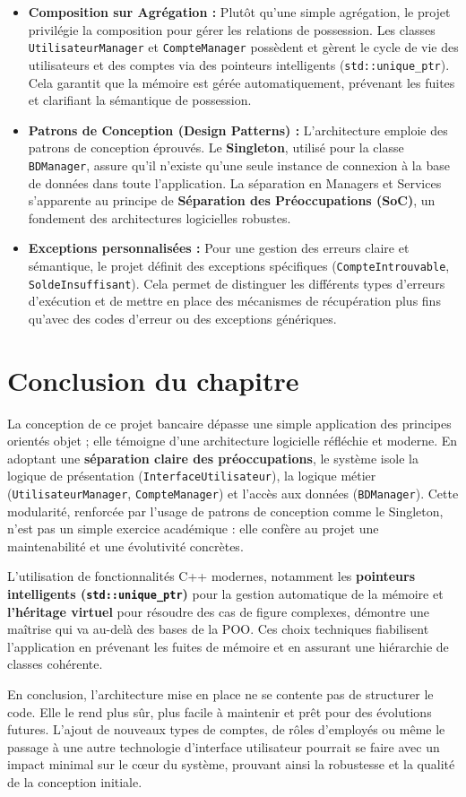 \begin{itemize}[leftmargin=*]
  \item \textbf{Composition sur Agrégation :} Plutôt qu'une simple agrégation, le projet privilégie la composition pour gérer les relations de possession. Les classes \texttt{UtilisateurManager} et \texttt{CompteManager} possèdent et gèrent le cycle de vie des utilisateurs et des comptes via des pointeurs intelligents (\texttt{std::unique\_ptr}). Cela garantit que la mémoire est gérée automatiquement, prévenant les fuites et clarifiant la sémantique de possession. 

  \item \textbf{Patrons de Conception (Design Patterns) :} L'architecture emploie des patrons de conception éprouvés. Le \textbf{Singleton}, utilisé pour la classe \texttt{BDManager}, assure qu'il n'existe qu'une seule instance de connexion à la base de données dans toute l'application. La séparation en Managers et Services s'apparente au principe de \textbf{Séparation des Préoccupations (SoC)}, un fondement des architectures logicielles robustes. 

  \item \textbf{Exceptions personnalisées :} Pour une gestion des erreurs claire et sémantique, le projet définit des exceptions spécifiques (\texttt{CompteIntrouvable}, \texttt{SoldeInsuffisant}). Cela permet de distinguer les différents types d'erreurs d'exécution et de mettre en place des mécanismes de récupération plus fins qu'avec des codes d'erreur ou des exceptions génériques.
\end{itemize}

\section{Conclusion du chapitre}
La conception de ce projet bancaire dépasse une simple application des principes orientés objet ; elle témoigne d'une architecture logicielle réfléchie et moderne. En adoptant une \textbf{séparation claire des préoccupations}, le système isole la logique de présentation (\texttt{InterfaceUtilisateur}), la logique métier (\texttt{UtilisateurManager}, \texttt{CompteManager}) et l'accès aux données (\texttt{BDManager}). Cette modularité, renforcée par l'usage de patrons de conception comme le Singleton, n'est pas un simple exercice académique : elle confère au projet une maintenabilité et une évolutivité concrètes.

L'utilisation de fonctionnalités C++ modernes, notamment les \textbf{pointeurs intelligents (\texttt{std::unique\_ptr})} pour la gestion automatique de la mémoire et \textbf{l'héritage virtuel} pour résoudre des cas de figure complexes, démontre une maîtrise qui va au-delà des bases de la POO. Ces choix techniques fiabilisent l'application en prévenant les fuites de mémoire et en assurant une hiérarchie de classes cohérente.

En conclusion, l'architecture mise en place ne se contente pas de structurer le code. Elle le rend plus sûr, plus facile à maintenir et prêt pour des évolutions futures. L'ajout de nouveaux types de comptes, de rôles d'employés ou même le passage à une autre technologie d'interface utilisateur pourrait se faire avec un impact minimal sur le cœur du système, prouvant ainsi la robustesse et la qualité de la conception initiale.
